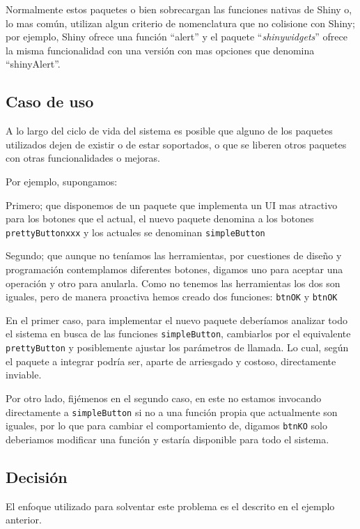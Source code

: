 \documentclass[
]{book}
\begin{document}
Normalmente estos paquetes o bien sobrecargan las funciones nativas de Shiny o, lo mas común, utilizan algun criterio de nomenclatura que no colisione con Shiny; por ejemplo, Shiny ofrece una función ``alert'' y el paquete ``\emph{shinywidgets}'' ofrece la misma funcionalidad con una versión con mas opciones que denomina ``shinyAlert''.

\hypertarget{caso-de-uso}{%
\subsection{Caso de uso}\label{caso-de-uso}}

A lo largo del ciclo de vida del sistema es posible que alguno de los paquetes utilizados dejen de existir o de estar soportados, o que se liberen otros paquetes con otras funcionalidades o mejoras.

Por ejemplo, supongamos:

Primero; que disponemos de un paquete que implementa un UI mas atractivo para los botones que el actual, el nuevo paquete denomina a los botones \texttt{prettyButtonxxx} y los actuales se denominan \texttt{simpleButton}

Segundo; que aunque no teníamos las herramientas, por cuestiones de diseño y programación contemplamos diferentes botones, digamos uno para aceptar una operación y otro para anularla. Como no tenemos las herramientas los dos son iguales, pero de manera proactiva hemos creado dos funciones: \texttt{btnOK} y \texttt{btnOK}

En el primer caso, para implementar el nuevo paquete deberíamos analizar todo el sistema en busca de las funciones \texttt{simpleButton}, cambiarlos por el equivalente \texttt{prettyButton} y posiblemente ajustar los parámetros de llamada. Lo cual, según el paquete a integrar podría ser, aparte de arriesgado y costoso, directamente inviable.

Por otro lado, fijémenos en el segundo caso, en este no estamos invocando directamente a \texttt{simpleButton} si no a una función propia que actualmente son iguales, por lo que para cambiar el comportamiento de, digamos \texttt{btnKO} solo deberiamos modificar una función y estaría disponible para todo el sistema.

\hypertarget{decisiuxf3n}{%
\subsection{Decisión}\label{decisiuxf3n}}

El enfoque utilizado para solventar este problema es el descrito en el ejemplo anterior.
\end{document}
